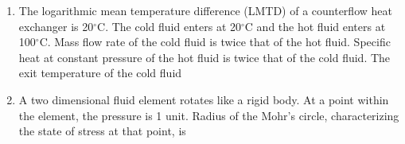 \documentclass[journal,12pt,onecolumn]{IEEEtran}
\begin{document}
\begin{enumerate}
          \begin{enumerate}
          \end{enumerate}

    \item The logarithmic mean temperature difference (LMTD) of a counterflow heat exchanger is 20$^\circ$C. The cold fluid enters at 20$^\circ$C and the hot fluid enters at 100$^\circ$C. Mass flow rate of the cold fluid is twice that of the hot fluid. Specific heat at constant pressure of the hot fluid is twice that of the cold fluid. The exit temperature of the cold fluid\\

          \begin{enumerate}
          \end{enumerate}

    \item A two dimensional fluid element rotates like a rigid body. At a point within the element, the pressure is 1 unit. Radius of the Mohr's circle, characterizing the state of stress at that point, is\\

          \begin{enumerate}
          \end{enumerate}


\end{enumerate}
\end{document}

